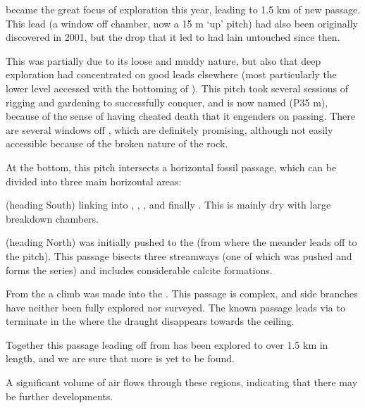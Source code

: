  became the great focus of exploration this year, leading to 1.5 km of new
passage. This lead (a window off  chamber, now a 15 m `up' pitch) had also been originally discovered in 2001, but the drop that it led to had lain untouched since then.

This was partially due to its loose and muddy nature, but also that deep
exploration had concentrated on good leads elsewhere (most particularly
the lower  level accessed with the bottoming of
). This pitch took several sessions of rigging and
gardening to successfully conquer, and is now named  (P35
m), because of the sense of having cheated death that it engenders on
passing. There are several windows off ,
which are definitely promising,
although not easily accessible because of the broken nature of the rock.

At the bottom, this pitch intersects a horizontal fossil passage, which can be divided into three main horizontal areas:

\textbf{} (heading South) linking into ,
, ,  and
finally . This is mainly dry with large breakdown
chambers.

\textbf{} (heading North) was initially pushed to the  (from where the  meander leads off to the  pitch). This passage bisects three streamways (one of which was pushed and forms the  series) and includes considerable calcite formations.

From the  a climb was made into the \textbf{}. This passage is complex, and side branches have neither
been fully explored nor surveyed. The known passage leads via  to terminate in the  where the draught disappears towards the ceiling.

Together this passage leading off from  has been explored to over 1.5 km in length, and we are sure that more is yet to be found.

A significant volume of air flows through these regions, indicating that there may be further developments.



